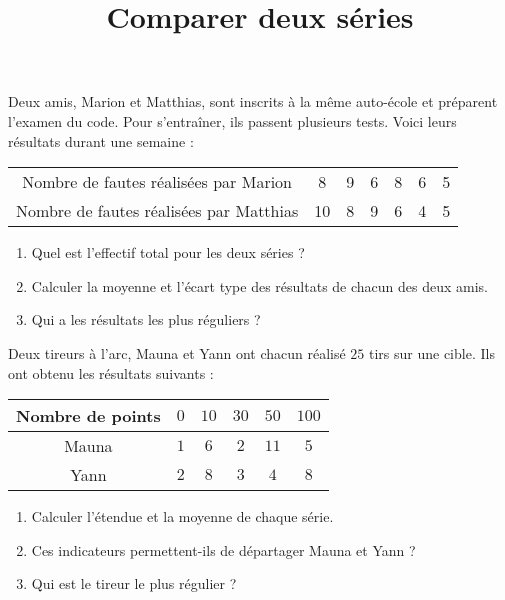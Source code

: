 \documentclass[a4paper]{article}
\begin{document}
\title{Comparer deux séries}

\pagestyle{empty}

\date{}
\author{}

\maketitle{}

\exo Deux amis, Marion et Matthias, sont inscrits à la même auto-école et préparent l'examen du code. Pour s'entraîner, ils passent plusieurs tests. Voici leurs résultats durant une semaine :

\begin{center}
  \begin{tabular}{@{}ccccccc@{}}
    \toprule
    Nombre de fautes réalisées par Marion & 8 & 9 & 6 & 8 & 6 & 5\\
    Nombre de fautes réalisées par Matthias & 10 & 8 & 9 & 6 & 4 & 5\\
    \bottomrule
  \end{tabular}
\end{center}

\begin{enumerate}
  \item Quel est l'effectif total pour les deux séries ?
  \item Calculer la moyenne et l'écart type des résultats de chacun des deux amis.
  \item Qui a les résultats les plus réguliers ?
\end{enumerate}

\bigskip

\exo Deux tireurs à l'arc, Mauna et Yann ont chacun réalisé $25$ tirs sur une cible. Ils ont obtenu les résultats suivants :

\begin{center}
  \begin{tabular}{@{}cccccc@{}}
    \toprule
    Nombre de points & $0$ & $10$ & $30$ & $50$ & $100$\\
    \midrule
    Mauna & $1$ & $6$ & $2$ & $11$ & $5$\\
    Yann & $2$ & $8$ & $3$ & $4$ & $8$\\
    \bottomrule
\end{tabular}
\end{center}

\begin{enumerate}
  \item Calculer l'étendue et la moyenne de chaque série.
  \item Ces indicateurs permettent-ils de départager Mauna et Yann ?
  \item Qui est le tireur le plus régulier ?
\end{enumerate}
\end{document}
